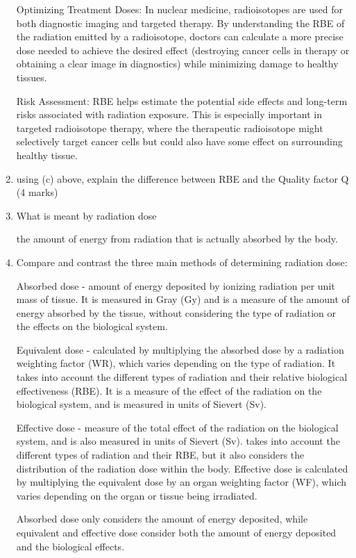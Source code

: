 \documentclass[a4paper,12pt]{article}
\begin{document}
\begin{enumerate}
Optimizing Treatment Doses:  In nuclear medicine, radioisotopes are used for both diagnostic imaging and targeted therapy. By understanding the RBE of the radiation emitted by a radioisotope, doctors can calculate a more precise dose needed to achieve the desired effect (destroying cancer cells in therapy or obtaining a clear image in diagnostics) while minimizing damage to healthy tissues.

Risk Assessment:  RBE helps estimate the potential side effects and long-term risks associated with radiation exposure. This is especially important in targeted radioisotope therapy, where the therapeutic radioisotope might selectively target cancer cells but could also have some effect on surrounding healthy tissue.
\item using (c) above, explain the difference between RBE and the Quality factor Q (4 marks)

\item What is meant by radiation dose 

the amount of energy from radiation that is actually absorbed by the body. 
\item Compare and contrast the three main methods of determining radiation dose:

Absorbed dose -  amount of energy deposited by ionizing radiation per unit mass of tissue. It is measured in  Gray (Gy) and is a measure of the amount of energy absorbed by the tissue, without considering the type of radiation or the effects on the biological system.

Equivalent dose - calculated by multiplying the absorbed dose by a radiation weighting factor (WR), which varies depending on the type of radiation. It takes into account the different types of radiation and their relative biological effectiveness (RBE). It is a measure of the effect of the radiation on the biological system, and is measured in units of Sievert (Sv). 

Effective dose -  measure of the total effect of the radiation on the biological system, and is also measured in units of Sievert (Sv). takes into account the different types of radiation and their RBE, but it also considers the distribution of the radiation dose within the body. Effective dose is calculated by multiplying the equivalent dose by an organ weighting factor (WF), which varies depending on the organ or tissue being irradiated. 

Absorbed dose only considers the amount of energy deposited, while equivalent and effective dose consider both the amount of energy deposited and the biological effects.


\end{enumerate}
\end{document}
